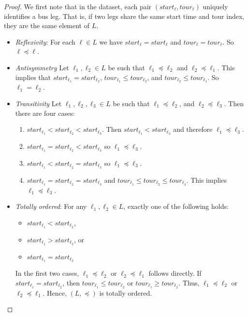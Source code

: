 \documentclass[]{amsart}
\newcommand{\param}{\mathit}
\theoremstyle{plain}
\begin{document}
\begin{proof}We first note that in the dataset, each pair $(\param{start}_\ell,\param{tour}_\ell)$ uniquely identifies a bus leg. That is, if two legs share the same start time and tour index, they are the same element of $L$.
\begin{itemize}
        \item \textit{Reflexivity}: For each $\ell \in L$ we have $\param{start}_{\ell}=\param{start}_{\ell}$ and $\param{tour}_{\ell}  = \param{tour}_{\ell}$. So $\ell \preceq \ell $.
   \item  \textit{Antisymmetry} Let $\ell_1,\ell_2 \in L$ be such that $\ell_1\preceq \ell_2$ and $\ell_2\preceq \ell_1$. This implies that $\param{start}_{\ell_1}=\param{start}_{\ell_2}$, $\param{tour}_{\ell_1}  \le \param{tour}_{\ell_2}$, and $\param{tour}_{\ell_2}  \le \param{tour}_{\ell_1}$. So $\ell_1 = \ell_2$.
   \item \textit{Transitivity} Let $\ell_1,\ell_2, \ell_3 \in L$ be such that  $\ell_1 \preceq \ell_2$, and $\ell_2 \preceq \ell_3$. Then there are four cases:
   \begin{enumerate}
       \item  $\param{start}_{\ell_1} <\param{start}_{\ell_2}<\param{start}_{\ell_3}$. Then $\param{start}_{\ell_1} < \param{start}_{\ell_3}$ and therefore $\ell_1 \preceq \ell_3$.
       \item  $\param{start}_{\ell_1} =\param{start}_{\ell_2}<\param{start}_{\ell_3}$ so $\ell_1 \preceq \ell_3$.
              \item  $\param{start}_{\ell_1} <\param{start}_{\ell_2}=\param{start}_{\ell_3}$ so $\ell_1 \preceq \ell_3$.
       
       \item $\param{start}_{\ell_1} =\param{start}_{\ell_2}=\param{start}_{\ell_3}$ and $\param{tour}_{\ell_1}\le \param{tour}_{\ell_2} \le \param{tour}_{\ell_3}$. This implies $\ell_1 \preceq \ell_3$.
   \end{enumerate}
   \item \textit{Totally ordered}: For any $\ell_1, \ell_2 \in L$, exactly one of the following holds:  
   \begin{itemize}
       \item   $\param{start}_{\ell_1} < \param{start}_{\ell_2}$,  
   \item  $\param{start}_{\ell_1} > \param{start}_{\ell_2}$, or  
   \item $\param{start}_{\ell_1} = \param{start}_{\ell_2}$
   \end{itemize}
   In the first two cases, $\ell_1 \preceq \ell_2$ or $\ell_2 \preceq \ell_1$ follows directly.  If $\param{start}_{\ell_1} = \param{start}_{\ell_2}$, then $\param{tour}_{\ell_1} \leq \param{tour}_{\ell_2}$ or $\param{tour}_{\ell_1} \geq \param{tour}_{\ell_2}$. Thus, $\ell_1 \preceq \ell_2$ or $\ell_2 \preceq \ell_1$.  
   Hence, $(L, \preceq)$ is totally ordered.
 \qedhere
    \end{itemize}
\end{proof}
\end{document}
